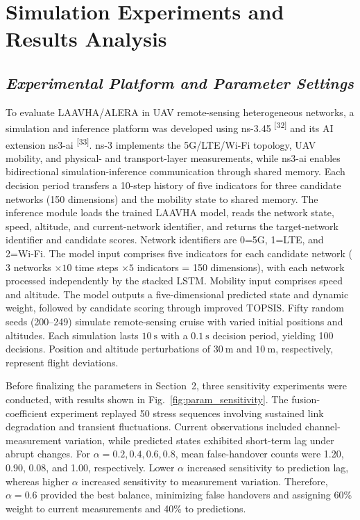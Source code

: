 \documentclass[10pt,a4paper]{article}
\newcommand{\upcite}[1]{\textsuperscript{[#1]}}
\begin{document}
\section{Simulation Experiments and Results Analysis}

\subsection{\textit{Experimental Platform and Parameter Settings}}

To evaluate LAAVHA/ALERA in UAV remote-sensing heterogeneous networks, a simulation and inference platform was developed using ns-3.45 \upcite{32} and its AI extension ns3-ai \upcite{33}. ns-3 implements the 5G/LTE/Wi-Fi topology, UAV mobility, and physical- and transport-layer measurements, while ns3-ai enables bidirectional simulation-inference communication through shared memory. Each decision period transfers a 10-step history of five indicators for three candidate networks (150 dimensions) and the mobility state to shared memory. The inference module loads the trained LAAVHA model, reads the network state, speed, altitude, and current-network identifier, and returns the target-network identifier and candidate scores. Network identifiers are 0=5G, 1=LTE, and 2=Wi-Fi. The model input comprises five indicators for each candidate network ($3$ networks $\times10$ time steps $\times5$ indicators = 150 dimensions), with each network processed independently by the stacked LSTM. Mobility input comprises speed and altitude. The model outputs a five-dimensional predicted state and dynamic weight, followed by candidate scoring through improved TOPSIS. Fifty random seeds (200--249) simulate remote-sensing cruise with varied initial positions and altitudes. Each simulation lasts $10~\mathrm{s}$ with a $0.1~\mathrm{s}$ decision period, yielding 100 decisions. Position and altitude perturbations of $30~\mathrm{m}$ and $10~\mathrm{m}$, respectively, represent flight deviations.

Before finalizing the parameters in Section~2, three sensitivity experiments were conducted, with results shown in Fig.~\ref{fig:param_sensitivity}. The fusion-coefficient experiment replayed 50 stress sequences involving sustained link degradation and transient fluctuations. Current observations included channel-measurement variation, while predicted states exhibited short-term lag under abrupt changes. For $\alpha=0.2,0.4,0.6,0.8$, mean false-handover counts were 1.20, 0.90, 0.08, and 1.00, respectively. Lower $\alpha$ increased sensitivity to prediction lag, whereas higher $\alpha$ increased sensitivity to measurement variation. Therefore, $\alpha=0.6$ provided the best balance, minimizing false handovers and assigning 60\% weight to current measurements and 40\% to predictions.
\end{document}
